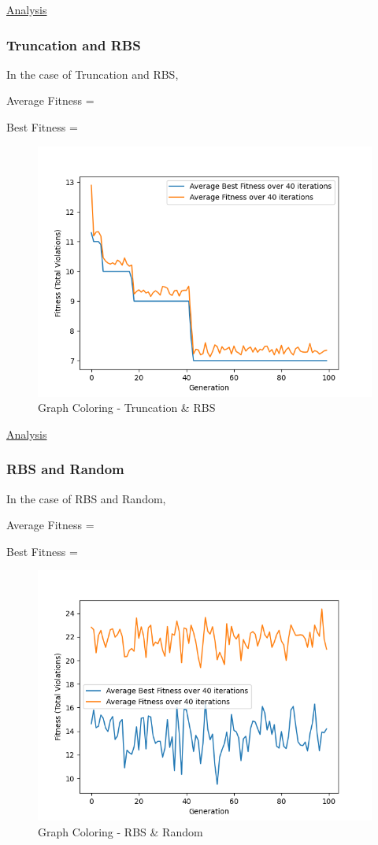 \documentclass[11pt, letterpaper]{article}
\begin{document}
\underline{Analysis}
\subsubsection {Truncation and RBS}
In the case of Truncation and RBS,

Average Fitness = 

Best Fitness = 
\begin{figure}[H]
    \centering
    \includegraphics[scale = 0.6]{images/graphcoloring_tr_rb.png}
    \caption {Graph Coloring - Truncation \& RBS}
    \label {fig:gcTR}
\end{figure}

\underline{Analysis}
\subsubsection {RBS and Random}
In the case of RBS and Random,

Average Fitness = 

Best Fitness = 
\begin{figure}[H]
    \centering
    \includegraphics[scale = 0.6]{images/graphcoloring_rb_rd.png}
    \caption {Graph Coloring - RBS \& Random}
    \label {fig:gcRbR}
\end{figure}
\end{document}
